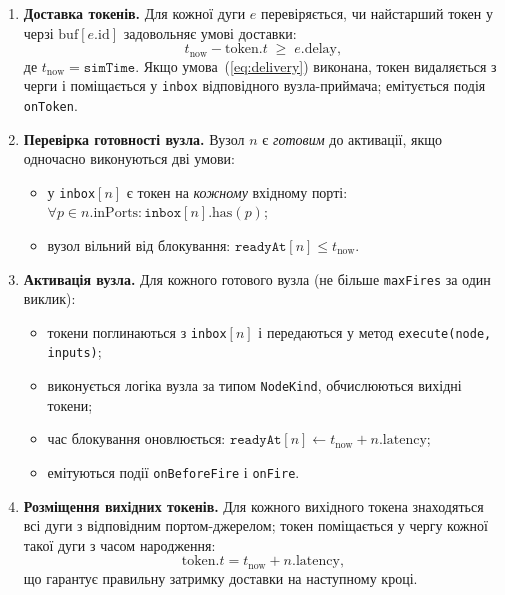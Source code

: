\begin{enumerate}
  \item \textbf{Доставка токенів.} Для кожної дуги $e$ перевіряється,
    чи найстарший токен у черзі $\mathrm{buf}[e.\mathrm{id}]$
    задовольняє умові доставки:
    \begin{equation}
      t_{\text{now}} - \mathrm{token}.t \;\geq\; e.\mathrm{delay},
      \label{eq:delivery}
    \end{equation}
    де $t_{\text{now}} = \texttt{simTime}$. Якщо умова~(\ref{eq:delivery})
    виконана, токен видаляється з черги і поміщається у \texttt{inbox}
    відповідного вузла-приймача; емітується подія \texttt{onToken}.

  \item \textbf{Перевірка готовності вузла.} Вузол $n$ є
    \emph{готовим} до активації, якщо одночасно виконуються дві умови:
    \begin{itemize}
      \item[(а)] у \texttt{inbox}$[n]$ є токен на \emph{кожному}
        вхідному порті: $\forall p \in n.\mathrm{inPorts}:
        \texttt{inbox}[n].\mathrm{has}(p)$;
      \item[(б)] вузол вільний від блокування:
        $\texttt{readyAt}[n] \leq t_{\text{now}}$.
    \end{itemize}

  \item \textbf{Активація вузла.} Для кожного готового вузла
    (не більше \texttt{maxFires} за один виклик):
    \begin{itemize}
      \item[3.1] токени поглинаються з \texttt{inbox}$[n]$ і
        передаються у метод \texttt{execute(node, inputs)};
      \item[3.2] виконується логіка вузла за типом
        \texttt{NodeKind}, обчислюються вихідні токени;
      \item[3.3] час блокування оновлюється:
        $\texttt{readyAt}[n] \leftarrow t_{\text{now}} +
        n.\mathrm{latency}$;
      \item[3.4] емітуються події \texttt{onBeforeFire} і
        \texttt{onFire}.
    \end{itemize}

  \item \textbf{Розміщення вихідних токенів.} Для кожного вихідного
    токена знаходяться всі дуги з відповідним портом-джерелом; токен
    поміщається у чергу кожної такої дуги з часом народження:
    \begin{equation}
      \mathrm{token}.t = t_{\text{now}} + n.\mathrm{latency},
      \label{eq:emit_time}
    \end{equation}
    що гарантує правильну затримку доставки на наступному кроці.
\end{enumerate}

